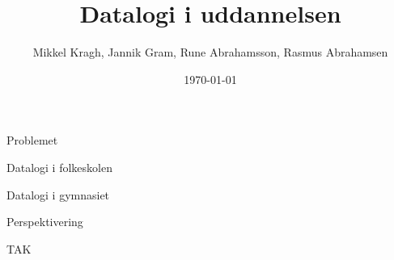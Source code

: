 \documentclass{beamer}
\title[Datalogi i uddannelsen]{Datalogi i uddannelsen}
\author{Mikkel Kragh, Jannik Gram, Rune Abrahamsson, Rasmus Abrahamsen}
\institute{DIKU}
\date{\today}
\begin{document}
\begin{frame}
\titlepage
\end{frame}


\begin{frame}{Problemet}

\end{frame}

\begin{frame}{Datalogi i folkeskolen}

\end{frame}

\begin{frame}{Datalogi i gymnasiet}

\end{frame}

\begin{frame}{Perspektivering}

\end{frame}

\begin{frame}{TAK}

\end{frame}
\end{document}
